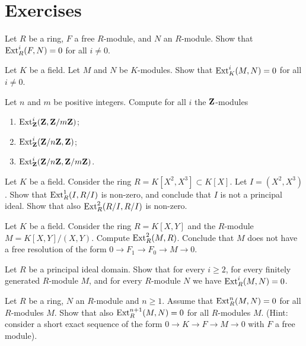 \newpage
\section*{Exercises}

\begin{exercise}
Let $R$ be a ring, $F$ a free $R$-module, and $N$ an $R$-module. Show that $\operatorname{Ext}^i_R(F,N)=0$ for all $i\neq 0$.
\end{exercise}

\begin{exercise}
Let $K$ be a field. Let $M$ and $N$ be $K$-modules. Show that $\operatorname{Ext}^i_K(M,N)=0$ for all $i\neq 0$.
\end{exercise}



\begin{exercise}
Let $n$ and $m$ be positive integers. Compute for all $i$ the ${\mathbf{Z}}$-modules
\begin{enumerate}
\item $\operatorname{Ext}^i_{\mathbf{Z}}({\mathbf{Z}},{\mathbf{Z}}/m{\mathbf{Z}})$;
\item $\operatorname{Ext}^i_{\mathbf{Z}}({\mathbf{Z}}/n{\mathbf{Z}},{\mathbf{Z}})$;
\item $\operatorname{Ext}^i_{\mathbf{Z}}({\mathbf{Z}}/n{\mathbf{Z}},{\mathbf{Z}}/m{\mathbf{Z}})$.
\end{enumerate}
\end{exercise}

\begin{exercise}
Let $K$ be a field.
Consider the ring $R=K[X^2,X^3] \subset K[X]$. Let $I=(X^2,X^3)$. Show that $\operatorname{Ext}^1_R(I,R/I)$ is non-zero, and conclude that $I$ is not a principal ideal. Show that also $\operatorname{Ext}^2_R(R/I,R/I)$ is non-zero.
\end{exercise}

\begin{exercise}
Let $K$ be a field. Consider the ring $R=K[X,Y]$ and the $R$-module $M=K[X,Y]/(X,Y)$. Compute $\operatorname{Ext}^2_R(M,R)$. Conclude that $M$ does not have a free resolution of the form $0\to F_1 \to F_0 \to M \to 0$.
\end{exercise}


\begin{exercise}
Let $R$ be a principal ideal domain. Show that for every $i\geq 2$, for every finitely generated $R$-module $M$,
and for every $R$-module $N$ we have $\operatorname{Ext}^i_R(M,N)=0$.
\end{exercise}


\begin{exercise}Let $R$ be a ring, $N$ an $R$-module and $n\geq 1$. Assume that $\operatorname{Ext}^n_R(M,N)=0$ for all $R$-modules $M$. Show that also $\operatorname{Ext}^{n+1}_R(M,N)=0$ for all $R$-modules $M$. (Hint: consider a short exact sequence of the form $0 \to K \to F \to M \to 0$ with $F$ a free module). 
\end{exercise}


